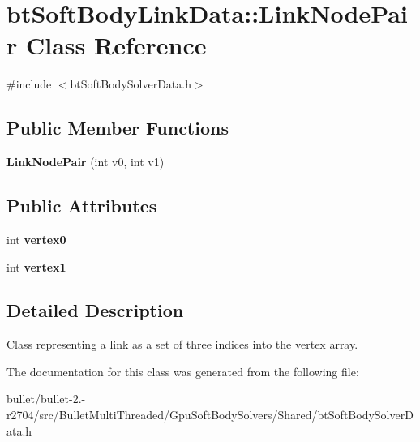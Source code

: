 \hypertarget{classbt_soft_body_link_data_1_1_link_node_pair}{\section{bt\+Soft\+Body\+Link\+Data\+:\+:Link\+Node\+Pair Class Reference}
\label{classbt_soft_body_link_data_1_1_link_node_pair}
}


{\ttfamily \#include $<$bt\+Soft\+Body\+Solver\+Data.\+h$>$}

\subsection*{Public Member Functions}
\begin{DoxyCompactItemize}
\item 
\hypertarget{classbt_soft_body_link_data_1_1_link_node_pair_a444221c0b4b243d75127162ed0c38b41}{{\bfseries Link\+Node\+Pair} (int v0, int v1)}\label{classbt_soft_body_link_data_1_1_link_node_pair_a444221c0b4b243d75127162ed0c38b41}

\end{DoxyCompactItemize}
\subsection*{Public Attributes}
\begin{DoxyCompactItemize}
\item 
\hypertarget{classbt_soft_body_link_data_1_1_link_node_pair_a3e0c3b59017f78785112335bf7f4eee6}{int {\bfseries vertex0}}\label{classbt_soft_body_link_data_1_1_link_node_pair_a3e0c3b59017f78785112335bf7f4eee6}

\item 
\hypertarget{classbt_soft_body_link_data_1_1_link_node_pair_a5d7726c44af214bc51b7a168e5888f6b}{int {\bfseries vertex1}}\label{classbt_soft_body_link_data_1_1_link_node_pair_a5d7726c44af214bc51b7a168e5888f6b}

\end{DoxyCompactItemize}


\subsection{Detailed Description}
Class representing a link as a set of three indices into the vertex array. 

The documentation for this class was generated from the following file\+:\begin{DoxyCompactItemize}
\item 
bullet/bullet-\/2.-\/r2704/src/\+Bullet\+Multi\+Threaded/\+Gpu\+Soft\+Body\+Solvers/\+Shared/bt\+Soft\+Body\+Solver\+Data.\+h\end{DoxyCompactItemize}
